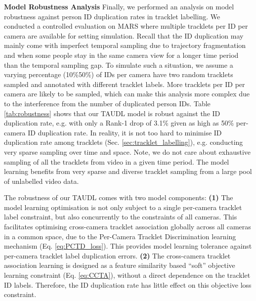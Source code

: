 \documentclass[runningheads]{llncs}
\begin{document}
\noindent \textbf{Model Robustness Analysis } Finally, we performed an analysis
on model robustness against person ID duplication rates in tracklet labelling.
We conducted a controlled evaluation on MARS 
where multiple tracklets per ID per camera are available for 
setting simulation.
Recall that the ID duplication may mainly 
come with imperfect temporal sampling due to trajectory fragmentation
and when some people stay in the same camera view for a longer
time period than the temporal sampling gap.
To simulate such a situation,
we assume a varying percentage (10\%50\%) of IDs per camera have
two random tracklets sampled and annotated with different tracklet labels.
More tracklets per ID per camera are likely to be sampled,
which can make this analysis more complex due to 
the interference from the number of duplicated person IDs.
Table \ref{tab:robustness} shows that 
our TAUDL model is robust against the ID duplication rate,
e.g. with only a Rank-1 drop of 3.1\% given 
as high as 50\% per-camera ID duplication rate.
In reality, it is not too hard to minimise ID duplication rate among tracklets
(Sec. \ref{sec:tracklet_labelling}),
e.g. conducting very sparse sampling over time and space. Note, we do
not care about exhaustive sampling of all the tracklets from video in
a given time period. The model learning benefits from very sparse and
diverse tracklet sampling from a large pool of unlabelled video data.

The robustness of our TAUDL comes with two model components:
{\bf (1)} The model learning optimisation is not only subject to
a single per-camera tracklet label constraint,
but also concurrently to the constraints of all cameras.
This facilitates optimising cross-camera 
tracklet association globally across all cameras in a common
space, due to the Per-Camera Tracklet Discrimination learning mechanism
(Eq. \eqref{eq:PCTD_loss}).
This provides model learning tolerance against
per-camera tracklet label duplication errors.
{\bf (2)} The cross-camera tracklet association learning 
is designed as a feature similarity based ``soft'' objective learning
constraint (Eq. \eqref{eq:CCTA}), without a direct dependence on the
tracklet ID labels.
Therefore, the ID duplication rate has little effect on 
this objective loss constraint.
\end{document}
